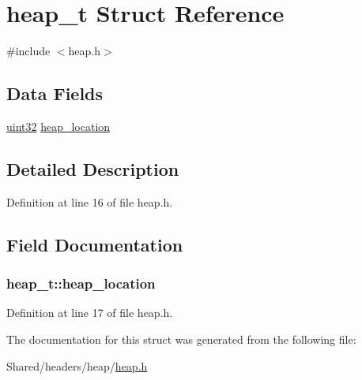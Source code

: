 \hypertarget{structheap__t}{
\section{heap\_\-t Struct Reference}
\label{structheap__t}
}


{\ttfamily \#include $<$heap.h$>$}

\subsection*{Data Fields}
\begin{DoxyCompactItemize}
\item 
\hyperlink{int__types_8h_a1134b580f8da4de94ca6b1de4d37975e}{uint32} \hyperlink{structheap__t_a822b345b413344a5ceb4618904537e82}{heap\_\-location}
\end{DoxyCompactItemize}


\subsection{Detailed Description}


Definition at line 16 of file heap.h.



\subsection{Field Documentation}
\hypertarget{structheap__t_a822b345b413344a5ceb4618904537e82}{
\subsubsection[{heap\_\-location}]{ {\bf heap\_\-t::heap\_\-location}}}
\label{structheap__t_a822b345b413344a5ceb4618904537e82}


Definition at line 17 of file heap.h.



The documentation for this struct was generated from the following file:\begin{DoxyCompactItemize}
\item 
Shared/headers/heap/\hyperlink{heap_8h}{heap.h}\end{DoxyCompactItemize}
